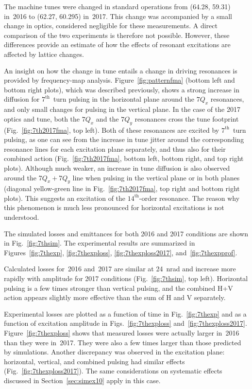 \documentclass[%
 reprint,
 amsmath,amssymb,
 aps,
prstab,
longbibliography
]{revtex4-1}
\begin{document}
The machine tunes were changed in standard operations from (64.28,
59.31) in~2016 to (62.27, 60.295) in~2017. This change was accompanied
by a small change in optics, considered negligible for these
measurements. A direct comparison of the two experiments is therefore
not possible. However, these differences provide an estimate of how
the effects of resonant excitations are affected by lattice changes.

An insight on how the change in tune entails a change in driving
resonances is provided by frequency-map analysis.
Figure~\ref{fig:patternfma} (bottom left and bottom right plots),
which was described previously, shows a strong increase in diffusion
for $7^{\mathrm{th}}$~turn pulsing in the horizontal plane around the
$7Q_x$ resonances, and only small changes for pulsing in the vertical
plane. In the case of the 2017 optics and tune, both the $7Q_x$ and
the $7Q_y$ resonances cross the tune footprint
(Fig.~\ref{fig:7th2017fma}, top left). Both of these resonances are
excited by $7^{\mathrm{th}}$~turn pulsing, as one can see from the
increase in tune jitter around the corresponding resonance lines for
each excitation plane separately, and thus also for their combined
action (Fig.~\ref{fig:7th2017fma}, bottom left, bottom right, and top
right plots). Although much weaker, an increase in tune diffusion is
also observed around the $7Q_x + 7Q_y$ line when pulsing in the
vertical plane or in both planes (diagonal yellow-green line in
Fig.~\ref{fig:7th2017fma}, top right and bottom right plots). This
suggests an excitation of the $14^{\mathrm{th}}$-order resonance. The
reason why this phenomenon is much less pronounced for horizontal
excitations is not understood.

The simulated losses and emittances for both 2016 and 2017 conditions
are shown in Fig.~\ref{fig:7thsim}. The experimental results are
summarized in Figures~\ref{fig:7thexp}, \ref{fig:7thexploss},
\ref{fig:7thexploss2017}, and~\ref{fig:7thexpprof}.

Calculated losses for~2016 and~2017 are similar at 24~nrad and
increase more rapidly with amplitude for 2017 conditions
(Fig.~\ref{fig:7thsim}, top left). Horizontal pulsing is a few times
stronger than vertical pulsing, and the combined H+V action appears
slightly more effective than the sum of H and V separately.

Experimental losses are plotted as a function of time in
Fig.~\ref{fig:7thexp} and as a function of excitation amplitude in
Figs.~\ref{fig:7thexploss}
and~\ref{fig:7thexploss2017}. Figure~\ref{fig:7thexploss} shows that
measured losses were actually larger in~2016 than they were
in~2017. They were also a few times larger than those predicted by
simulations. Another discrepancy was observed in the excitation plane:
horizontal, vertical, and combined pulsing had similar effects
(Fig.~\ref{fig:7thexploss2017}). The same considerations on systematic
effects discussed in Section~\ref{sec:simex10} apply in this case.
\end{document}
